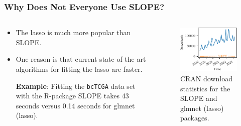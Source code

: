 \begin{frame}[c]
  \frametitle{Why Does Not Everyone Use SLOPE?}

  \begin{columns}
    \begin{column}{0.45\textwidth}
      \begin{itemize}
        \item<1-> The lasso is much more popular than SLOPE.
        \item<2-> One reason is that current state-of-the-art algorithms for fitting the lasso are faster.
        \medskip

        \textbf{Example}: Fitting the \texttt{bcTCGA} data set with the R-package SLOPE takes
        43 seconds versus 0.14 seconds for glmnet (lasso).
      \end{itemize}

    \end{column}
    \begin{column}{0.45\textwidth}
      \begin{figure}
        \centering
        \includegraphics[]{figures/cran-stats.pdf}
        \caption{%
          CRAN download statistics for the SLOPE and glmnet (lasso) packages.
        }
        \label{fig:cran-stats}
      \end{figure}
    \end{column}
  \end{columns}
\end{frame}

